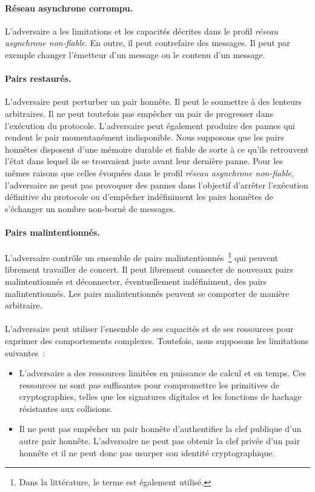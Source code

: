 \paragraph{Réseau asynchrone corrompu.} L'adversaire a les limitations et les capacités décrites dans le profil \emph{réseau asynchrone non-fiable}.
En outre, il peut contrefaire des messages.
Il peut par exemple changer l'émetteur d'un message ou le contenu d'un message.

\paragraph{Pairs restaurés.} L'adversaire peut perturber un pair honnête.
Il peut le soumettre à des lenteurs arbitraires.
Il ne peut toutefois pas empêcher un pair de progresser dans l'exécution du protocole.
L'adversaire peut également produire des pannes qui rendent le pair momentanément indisponible.
Nous supposons que les pairs honnêtes disposent d'une mémoire durable et fiable de sorte à ce qu'ils retrouvent l'état dans lequel ils se trouvaient juste avant leur dernière panne.
Pour les mêmes raisons que celles évoquées dans le profil \emph{réseau asynchrone non-fiable}, l'adversaire ne peut pas provoquer des pannes dans l'objectif d'arrêter l'exécution définitive du protocole ou d'empêcher indéfiniment les pairs honnêtes de s'échanger un nombre non-borné de messages.

\paragraph{Pairs malintentionnés.} L'adversaire contrôle un ensemble de pairs malintentionnés~\footnote{Dans la littérature, le terme  est également utilisé.} qui peuvent librement travailler de concert.
Il peut librement connecter de nouveaux pairs malintentionnés et déconnecter, éventuellement indéfiniment, des pairs malintentionnés. Les pairs malintentionnés peuvent se comporter de manière arbitraire.

\paragraph{}L'adversaire peut utiliser l'ensemble de ses capacités et de ses ressources pour exprimer des comportements complexes.
Toutefois, nous supposons les limitations suivantes~:

\begin{itemize}
  \item L'adversaire a des ressources limitées en puissance de calcul et en temps.
  Ces ressources ne sont pas suffisantes pour compromettre les primitives de cryptographies, telles que les signatures digitales et les fonctions de hachage résistantes aux collisions.
  \item Il ne peut pas empêcher un pair honnête d'authentifier la clef publique d'un autre pair honnête.
  L'adversaire ne peut pas obtenir la clef privée d'un pair honnête et il ne peut donc pas usurper son identité cryptographique.
\end{itemize}

